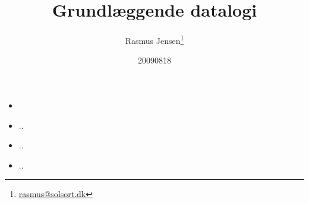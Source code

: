 \documentclass[a4paper,landscape]{slides}
\title{Grundlæggende datalogi}
\author{Rasmus Jensen\footnote{\url{rasmus@solsort.dk}}}
\date{20090818}
\begin{document}
\maketitle


\begin{slide}
	\begin{center} {\large 
	} \end{center}
	\begin{itemize} \addtolength{\itemsep}{-\baselineskip}
    		\item 
	\end{itemize}
\end{slide}


\begin{slide}
	\begin{center} {\large 
	} \end{center}
	\begin{itemize} \addtolength{\itemsep}{-\baselineskip}
		\item ..
		\item ..
		\item ..
	\end{itemize}
\end{slide}
\end{document}
